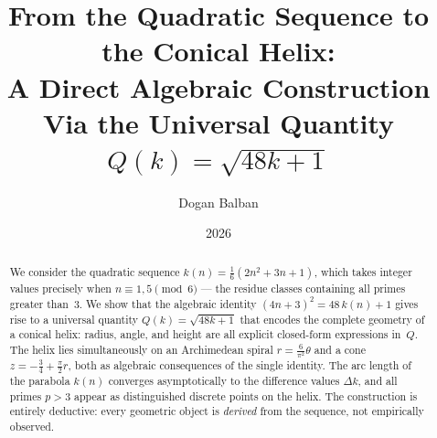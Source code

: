 \documentclass[12pt,a4paper]{article}
\title{%
  \textbf{From the Quadratic Sequence to the Conical Helix:\\[0.3em]
  A Direct Algebraic Construction}\\[0.8em]
  \large Via the Universal Quantity $Q(k) = \sqrt{48k+1}$
}
\author{Dogan Balban}
\date{2026}
\theoremstyle{plain}
\theoremstyle{definition}
\theoremstyle{remark}
\begin{document}
\maketitle

\begin{abstract}
We consider the quadratic sequence $k(n) = \frac{1}{6}(2n^2+3n+1)$,
which takes integer values precisely when $n \equiv 1, 5 \pmod{6}$ ---
the residue classes containing all primes greater than~$3$.
We show that the algebraic identity $(4n+3)^2 = 48\,k(n) + 1$ gives
rise to a universal quantity $Q(k) = \sqrt{48k+1}$ that encodes the
complete geometry of a conical helix: radius, angle, and height are
all explicit closed-form expressions in~$Q$.
The helix lies simultaneously on an Archimedean spiral
$r = \frac{6}{\pi^2}\theta$ and a cone $z = -\frac{3}{4} + \frac{\pi}{2}r$,
both as algebraic consequences of the single identity.
The arc length of the parabola $k(n)$ converges asymptotically to the
difference values $\Delta k$, and all primes $p > 3$ appear as
distinguished discrete points on the helix.
The construction is entirely deductive: every geometric object is
\emph{derived} from the sequence, not empirically observed.
\end{abstract}

\tableofcontents
\clearpage













\printbibliography
\end{document}
